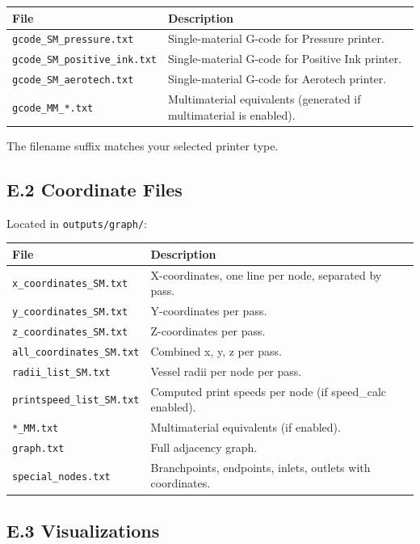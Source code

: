 \documentclass[11pt,letterpaper]{article}
\newcommand{\code}[1]{\texttt{#1}}
\begin{document}
\begin{longtable}{@{}L{5cm}p{9cm}@{}}
\toprule
\textbf{File} & \textbf{Description} \\
\midrule
\code{gcode\_SM\_pressure.txt} & Single-material G-code for Pressure printer. \\
\code{gcode\_SM\_positive\_ink.txt} & Single-material G-code for Positive Ink printer. \\
\code{gcode\_SM\_aerotech.txt} & Single-material G-code for Aerotech printer. \\
\code{gcode\_MM\_*.txt} & Multimaterial equivalents (generated if multimaterial is enabled). \\
\bottomrule
\end{longtable}

The filename suffix matches your selected printer type.

\subsection{E.2 Coordinate Files}

Located in \code{outputs/graph/}:

\begin{longtable}{@{}L{4.5cm}p{9.5cm}@{}}
\toprule
\textbf{File} & \textbf{Description} \\
\midrule
\code{x\_coordinates\_SM.txt} & X-coordinates, one line per node, separated by pass. \\
\code{y\_coordinates\_SM.txt} & Y-coordinates per pass. \\
\code{z\_coordinates\_SM.txt} & Z-coordinates per pass. \\
\code{all\_coordinates\_SM.txt} & Combined x, y, z per pass. \\
\code{radii\_list\_SM.txt} & Vessel radii per node per pass. \\
\code{printspeed\_list\_SM.txt} & Computed print speeds per node (if speed\_calc enabled). \\
\code{*\_MM.txt} & Multimaterial equivalents (if enabled). \\
\code{graph.txt} & Full adjacency graph. \\
\code{special\_nodes.txt} & Branchpoints, endpoints, inlets, outlets with coordinates. \\
\bottomrule
\end{longtable}

\subsection{E.3 Visualizations}
\end{document}
